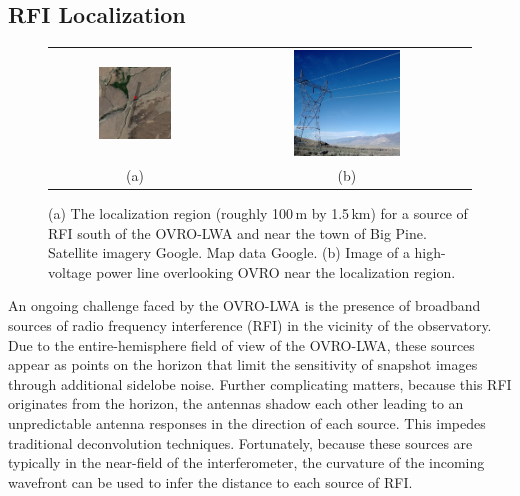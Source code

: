 \begin{bibunit}
\subsection{RFI Localization}

\begin{figure}
    \centering
    \begin{tabular}{cc}
        \includegraphics[width=0.45\textwidth]{figures/chapter2/google-maps-rfi-localization} &
        \includegraphics[width=0.45\textwidth]{figures/chapter2/power-line-picture} \\
        (a) & (b) \\
    \end{tabular}
    \caption{
        (a) The localization region (roughly 100\,m by 1.5\,km) for a source of RFI south of the
        OVRO-LWA and near the town of Big Pine. Satellite imagery  Google. Map
        data  Google.
        (b) Image of a high-voltage power line overlooking OVRO near the localization region.
    }
    \label{fig:rfi-localization}
\end{figure}

An ongoing challenge faced by the OVRO-LWA is the presence of broadband sources of radio frequency
interference (RFI) in the vicinity of the observatory. Due to the entire-hemisphere field of view of
the OVRO-LWA, these sources appear as points on the horizon that limit the sensitivity of snapshot
images through additional sidelobe noise. Further complicating matters, because this RFI originates
from the horizon, the antennas shadow each other leading to an unpredictable antenna responses in
the direction of each source. This impedes traditional deconvolution techniques.  Fortunately,
because these sources are typically in the near-field of the interferometer, the curvature of the
incoming wavefront can be used to infer the distance to each source of RFI.


\end{bibunit}
